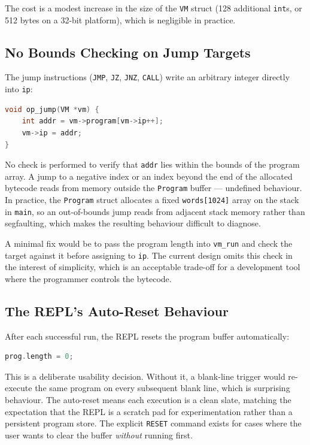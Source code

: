 The cost is a modest increase in the size of the \texttt{VM} struct (128 additional \texttt{int}s, or 512 bytes on a 32-bit platform), which is negligible in practice.

\subsection{No Bounds Checking on Jump Targets}

The jump instructions (\texttt{JMP}, \texttt{JZ}, \texttt{JNZ}, \texttt{CALL}) write an arbitrary integer directly into \texttt{ip}:

\begin{lstlisting}[language=C]
void op_jump(VM *vm) {
    int addr = vm->program[vm->ip++];
    vm->ip = addr;
}
\end{lstlisting}

No check is performed to verify that \texttt{addr} lies within the bounds of the program array. A jump to a negative index or an index beyond the end of the allocated bytecode reads from memory outside the \texttt{Program} buffer — undefined behaviour. In practice, the \texttt{Program} struct allocates a fixed \texttt{words[1024]} array on the stack in \texttt{main}, so an out-of-bounds jump reads from adjacent stack memory rather than segfaulting, which makes the resulting behaviour difficult to diagnose.

A minimal fix would be to pass the program length into \texttt{vm\_run} and check the target against it before assigning to \texttt{ip}. The current design omits this check in the interest of simplicity, which is an acceptable trade-off for a development tool where the programmer controls the bytecode.

\subsection{The REPL's Auto-Reset Behaviour}

After each successful run, the REPL resets the program buffer automatically:

\begin{lstlisting}[language=C]
prog.length = 0;
\end{lstlisting}

This is a deliberate usability decision. Without it, a blank-line trigger would re-execute the same program on every subsequent blank line, which is surprising behaviour. The auto-reset means each execution is a clean slate, matching the expectation that the REPL is a scratch pad for experimentation rather than a persistent program store. The explicit \texttt{RESET} command exists for cases where the user wants to clear the buffer \textit{without} running first.
